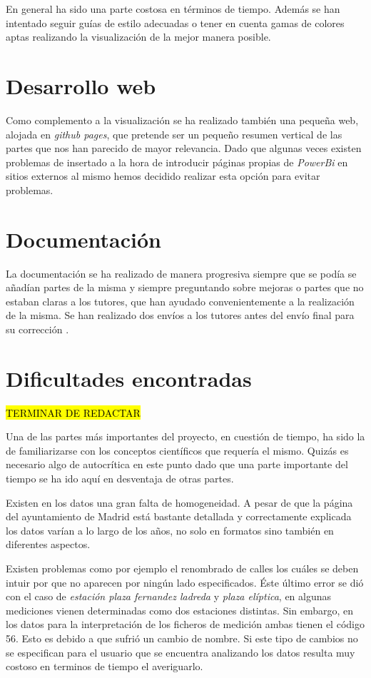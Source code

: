 En general ha sido una parte costosa en términos de tiempo. Además se han intentado seguir guías de estilo \cite{visualisation_2016} adecuadas o tener en cuenta gamas de colores aptas realizando la visualización de la mejor manera posible. 

\section{Desarrollo web}\label{dweb}

Como complemento a la visualización se ha realizado también una pequeña web, alojada en \textit{github pages}, que pretende ser un pequeño resumen vertical de las partes que nos han parecido de mayor relevancia. Dado que algunas veces existen problemas de insertado a la hora de introducir páginas propias de \textit{PowerBi} en sitios externos al mismo hemos decidido realizar esta opción para evitar problemas.

\section{Documentación}\label{docs}

La documentación se ha realizado de manera progresiva siempre que se podía se añadían partes de la misma y siempre preguntando sobre mejoras o partes que no estaban claras a los tutores, que han ayudado convenientemente a la realización de la misma. Se han realizado dos envíos a los tutores antes del envío final para su corrección .

\section{Dificultades encontradas}\label{inicio-proyecto}

 \hl{TERMINAR DE REDACTAR}

Una de las partes más importantes del proyecto, en cuestión de tiempo, ha sido la de familiarizarse con los conceptos científicos que requería el mismo. Quizás es necesario algo de autocrítica en este punto dado que una parte importante del tiempo se ha ido aquí en desventaja de otras partes. 

Existen en los datos una gran falta de homogeneidad. A pesar de que la página del ayuntamiento de Madrid está bastante detallada y correctamente explicada los datos varían a lo largo de los años, no solo en formatos sino también en diferentes aspectos. 

Existen problemas como por ejemplo el renombrado de calles los cuáles se deben intuir por que no aparecen por ningún lado especificados. Éste último error se dió con el caso de \textit{estación plaza fernandez ladreda} y \textit{plaza elíptica}, en algunas mediciones vienen determinadas como dos estaciones distintas. Sin embargo, en los datos para la interpretación de los ficheros de medición ambas tienen el código 56. Esto es debido a que sufrió un cambio de nombre. Si este tipo de cambios no se especifican para el usuario que se encuentra analizando los datos resulta muy costoso en terminos de tiempo el averiguarlo.

